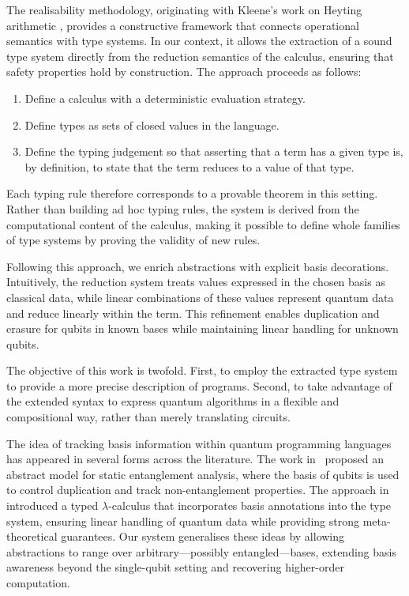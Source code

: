 \documentclass[runningheads,orivec,envcountsame,envcountsect]{llncs}
\begin{document}
The realisability methodology, originating with Kleene's work on Heyting
arithmetic \cite{KleeneJSL45}, provides a constructive framework that connects
operational semantics with type systems. In our context, it allows the
extraction of a sound type system directly from the reduction semantics of the
calculus, ensuring that safety properties hold by construction. The approach
proceeds as follows:
\begin{enumerate}
  \item Define a calculus with a deterministic evaluation strategy.
  \item Define types as sets of closed values in the language.
  \item Define the typing judgement so that asserting that a term has a given
  type is, by definition, to state that the term reduces to a value of that
  type.
\end{enumerate}
Each typing rule therefore corresponds to a provable theorem in this setting.
Rather than building ad hoc typing rules, the system is derived from the
computational content of the calculus, making it possible to define whole
families of type systems by proving the validity of new rules.

Following this approach, we enrich abstractions with explicit basis
decorations. Intuitively, the reduction system treats values expressed in the
chosen basis as classical data, while linear combinations of these values
represent quantum data and reduce linearly within the term. This refinement
enables duplication and erasure for qubits in known bases while maintaining
linear handling for unknown qubits.

The objective of this work is twofold. First, to employ the extracted type
system to provide a more precise description of programs. Second, to take
advantage of the extended syntax to express quantum algorithms in a flexible
and compositional way, rather than merely translating circuits.

The idea of tracking basis information within quantum programming languages has
appeared in several forms across the literature.  
The work in~\cite{Perdrix2008} proposed an abstract model for static
entanglement analysis, where the basis of qubits is used to control duplication
and track non-entanglement properties.  
The approach in~\cite{DiazcaroMonzonAPLAS25} introduced a typed
$\lambda$-calculus that incorporates basis annotations into the type system,
ensuring linear handling of quantum data while providing strong
meta-theoretical guarantees.  
Our system generalises these ideas by allowing abstractions to range over
arbitrary---possibly entangled---bases, extending basis awareness beyond the
single-qubit setting and recovering higher-order computation.
\end{document}
